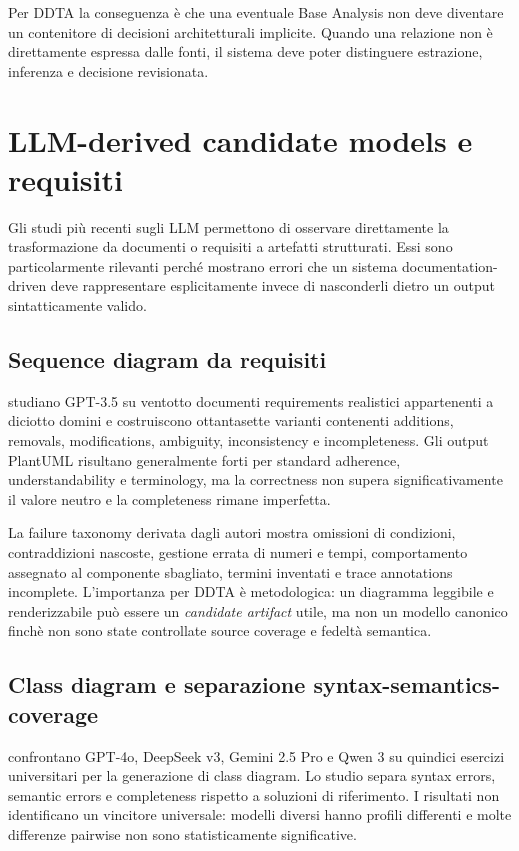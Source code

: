 \documentclass[12pt,a4paper,oneside]{report}
\newcommand{\candidateartifact}{\textit{candidate artifact}}
\begin{document}
Per DDTA la conseguenza è che una eventuale Base Analysis non deve diventare un contenitore di decisioni architetturali implicite. Quando una relazione non è direttamente espressa dalle fonti, il sistema deve poter distinguere estrazione, inferenza e decisione revisionata.

\section{LLM-derived candidate models e requisiti}

Gli studi più recenti sugli LLM permettono di osservare direttamente la trasformazione da documenti o requisiti a artefatti strutturati. Essi sono particolarmente rilevanti perché mostrano errori che un sistema documentation-driven deve rappresentare esplicitamente invece di nasconderli dietro un output sintatticamente valido.

\subsection{Sequence diagram da requisiti}

\citet{ferrari2024modelgeneration} studiano GPT-3.5 su ventotto documenti requirements realistici appartenenti a diciotto domini e costruiscono ottantasette varianti contenenti additions, removals, modifications, ambiguity, inconsistency e incompleteness. Gli output PlantUML risultano generalmente forti per standard adherence, understandability e terminology, ma la correctness non supera significativamente il valore neutro e la completeness rimane imperfetta.

La failure taxonomy derivata dagli autori mostra omissioni di condizioni, contraddizioni nascoste, gestione errata di numeri e tempi, comportamento assegnato al componente sbagliato, termini inventati e trace annotations incomplete. L'importanza per DDTA è metodologica: un diagramma leggibile e renderizzabile può essere un \candidateartifact{} utile, ma non un modello canonico finchè non sono state controllate source coverage e fedeltà semantica.

\subsection{Class diagram e separazione syntax-semantics-coverage}

\citet{garaccione2025llmcomparison} confrontano GPT-4o, DeepSeek v3, Gemini 2.5 Pro e Qwen 3 su quindici esercizi universitari per la generazione di class diagram. Lo studio separa syntax errors, semantic errors e completeness rispetto a soluzioni di riferimento. I risultati non identificano un vincitore universale: modelli diversi hanno profili differenti e molte differenze pairwise non sono statisticamente significative.
\end{document}
